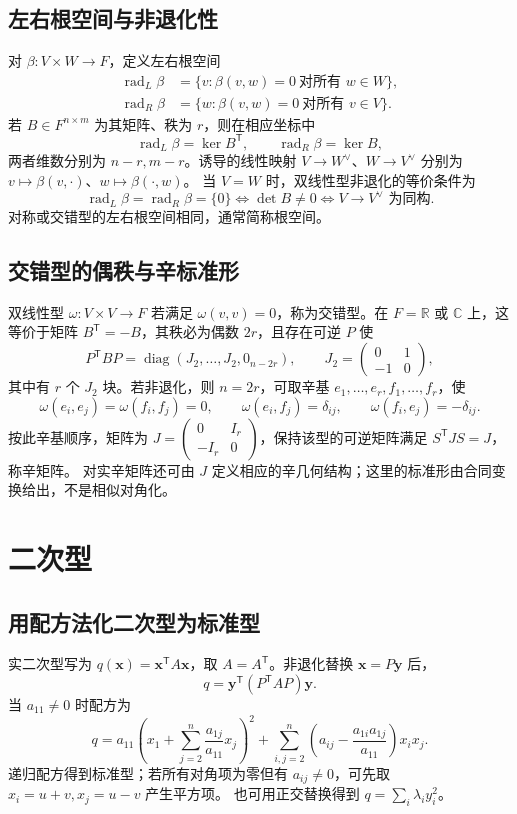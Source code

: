 \documentclass[../main.tex]{subfiles}
\begin{document}
\subsection{左右根空间与非退化性}
对 $\beta:V\times W\to F$，定义左右根空间
\begin{align*}
\operatorname{rad}_L\beta&=\{v:\beta(v,w)=0\ \text{对所有 }w\in W\},\\
\operatorname{rad}_R\beta&=\{w:\beta(v,w)=0\ \text{对所有 }v\in V\}.
\end{align*}
若 $B\in F^{n\times m}$ 为其矩阵、秩为 $r$，则在相应坐标中
\[
\operatorname{rad}_L\beta=\ker B^{\mathsf T},\qquad
\operatorname{rad}_R\beta=\ker B,
\]
两者维数分别为 $n-r,m-r$。诱导的线性映射 $V\to W^\vee$、$W\to V^\vee$ 分别为 $v\mapsto\beta(v,\cdot)$、$w\mapsto\beta(\cdot,w)$。
当 $V=W$ 时，双线性型非退化的等价条件为
\[
\operatorname{rad}_L\beta=\operatorname{rad}_R\beta=\{0\}
\iff\det B\ne0\iff V\longrightarrow V^\vee\text{ 为同构}.
\]
对称或交错型的左右根空间相同，通常简称根空间。
\subsection{交错型的偶秩与辛标准形}
双线性型 $\omega:V\times V\to F$ 若满足 $\omega(v,v)=0$，称为交错型。在 $F=\mathbb R$ 或 $\mathbb C$ 上，这等价于矩阵 $B^{\mathsf T}=-B$，其秩必为偶数 $2r$，且存在可逆 $P$ 使
\[
P^{\mathsf T}BP=\operatorname{diag}(J_2,\ldots,J_2,0_{n-2r}),\qquad
J_2=\begin{pmatrix}0&1\\-1&0\end{pmatrix},
\]
其中有 $r$ 个 $J_2$ 块。若非退化，则 $n=2r$，可取辛基 $e_1,\ldots,e_r,f_1,\ldots,f_r$，使
\[
\omega(e_i,e_j)=\omega(f_i,f_j)=0,\qquad
\omega(e_i,f_j)=\delta_{ij},\qquad \omega(f_i,e_j)=-\delta_{ij}.
\]
按此辛基顺序，矩阵为 $J=\begin{pmatrix}0&I_r\\-I_r&0\end{pmatrix}$，保持该型的可逆矩阵满足 $S^{\mathsf T}JS=J$，称辛矩阵。
对实辛矩阵还可由 $J$ 定义相应的辛几何结构；这里的标准形由合同变换给出，不是相似对角化。
\section{二次型}
\subsection{用配方法化二次型为标准型}
实二次型写为 $q(\bm x)=\bm x^{\mathsf T}A\bm x$，取 $A=A^{\mathsf T}$。非退化替换 $\bm x=P\bm y$ 后，
\[
q=\bm y^{\mathsf T}(P^{\mathsf T}AP)\bm y.
\]
当 $a_{11}\ne0$ 时配方为
\[
q=a_{11}\left(x_1+\sum_{j=2}^n\frac{a_{1j}}{a_{11}}x_j\right)^2
+\sum_{i,j=2}^n\left(a_{ij}-\frac{a_{1i}a_{1j}}{a_{11}}\right)x_ix_j.
\]
递归配方得到标准型；若所有对角项为零但有 $a_{ij}\ne0$，可先取 $x_i=u+v,x_j=u-v$ 产生平方项。
也可用正交替换得到 $q=\sum_i\lambda_i y_i^2$。
\end{document}
